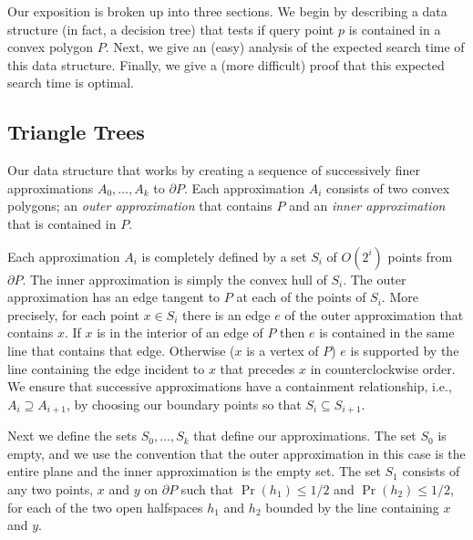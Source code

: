 \documentclass[charterfonts,lotsofwhite]{patmorin}
\newcommand{\boundary}{\partial}
\begin{document}
Our exposition is broken up into three sections.  We begin by
describing a data structure (in fact, a decision tree) that tests if
query point $p$ is contained in a convex polygon  $P$.  Next, we give
an (easy) analysis of the expected search time of this data structure.
Finally, we give a (more difficult) proof that this expected search
time is optimal.


\subsection{Triangle Trees}

Our data structure that works by creating a sequence of successively
finer approximations $A_0,\ldots,A_k$ to $\boundary P$.  Each
approximation $A_i$ consists of two convex polygons; an \emph{outer
approximation} that contains $P$ and an \emph{inner approximation}
that is contained in $P$.

Each approximation $A_i$ is completely defined by a set $S_i$ of
$O(2^i)$ points from $\boundary P$.  The inner approximation is simply
the convex hull of $S_i$.  The outer approximation has an edge tangent
to $P$ at each of the points of $S_i$.  More precisely, for each point
$x\in S_i$ there is an edge $e$ of the outer approximation that
contains $x$.  If $x$ is in the interior of an edge of $P$ then $e$ is
contained in the same line that contains that edge. Otherwise ($x$ is
a vertex of $P$) $e$ is supported by the line containing the edge
incident to $x$ that precedes $x$ in counterclockwise order.  We ensure
that successive approximations have a containment relationship, i.e.,
$A_i\supseteq A_{i+1}$, by choosing our boundary points so that
$S_i\subseteq S_{i+1}$.

Next we define the sets $S_0,\ldots,S_k$ that define our
approximations.  The set $S_0$ is empty, and we use the convention
that the outer approximation in this case is the entire plane and the
inner approximation is the empty set. The set $S_1$ consists of any two
points, $x$ and $y$ on $\boundary P$ such that $\Pr(h_1)\le 1/2$ and
$\Pr(h_2)\le 1/2$, for each of the two open halfspaces $h_1$ and $h_2$
bounded by the line containing $x$ and $y$.
\end{document}
